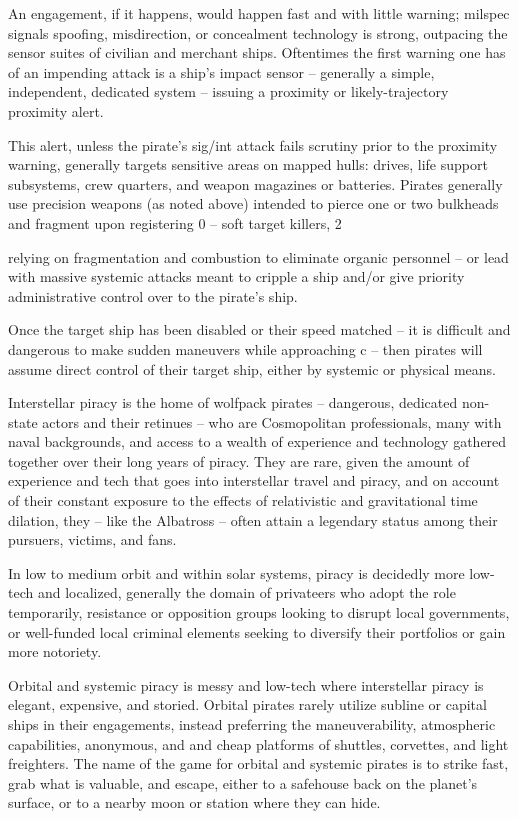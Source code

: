 An engagement, if it happens, would happen fast and with little warning; milspec signals
spoofing, misdirection, or concealment technology is strong, outpacing the sensor suites of
civilian and merchant ships. Oftentimes the first warning one has of an impending attack is a
ship’s impact sensor -- generally a simple, independent, dedicated system -- issuing a proximity
or likely-trajectory proximity alert.


This alert, unless the pirate’s sig/int attack fails scrutiny prior to the proximity warning, generally
targets sensitive areas on mapped hulls: drives, life support subsystems, crew quarters, and
weapon magazines or batteries. Pirates generally use precision weapons (as noted above)
intended to pierce one or two bulkheads and fragment upon registering 0  -- soft target killers,
                                                                                            2

relying on fragmentation and combustion to eliminate organic personnel -- or lead with massive
systemic attacks meant to cripple a ship and/or give priority administrative control over to the
pirate’s ship.

Once the target ship has been disabled or their speed matched -- it is difficult and dangerous to
make sudden maneuvers while approaching c -- then pirates will assume direct control of their
target ship, either by systemic or physical means.

Interstellar piracy is the home of wolfpack pirates -- dangerous, dedicated non-state actors and
their retinues -- who are Cosmopolitan professionals, many with naval backgrounds, and access
to a wealth of experience and technology gathered together over their long years of piracy. They
are rare, given the amount of experience and tech that goes into interstellar travel and piracy, and
on account of their constant exposure to the effects of relativistic and gravitational time dilation,
they  -- like the Albatross -- often attain a legendary status among their pursuers, victims, and
fans.

In low to medium orbit and within solar systems, piracy is decidedly more low-tech and localized,
generally the domain of privateers who adopt the role temporarily, resistance or opposition groups
looking to disrupt local governments, or well-funded local criminal elements seeking to diversify
their portfolios or gain more notoriety.

Orbital and systemic piracy is messy and low-tech where interstellar piracy is elegant, expensive,
and storied. Orbital pirates rarely utilize subline or capital ships in their engagements, instead
preferring the maneuverability, atmospheric capabilities, anonymous, and and cheap platforms of
shuttles, corvettes, and light freighters. The name of the game for orbital and systemic pirates is
to strike fast, grab what is valuable, and escape, either to a safehouse back on the planet’s
surface, or to a nearby moon or station where they can hide.


